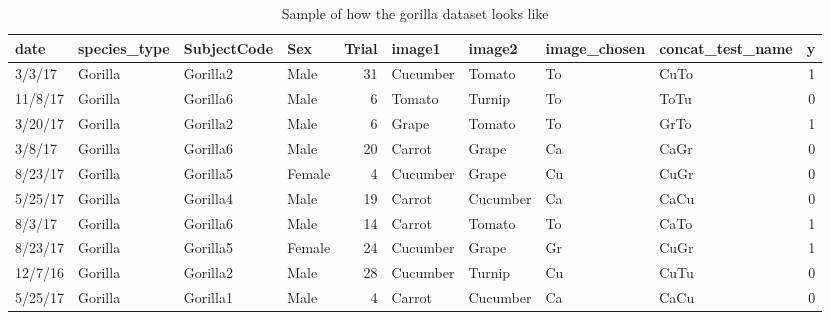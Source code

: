 \documentclass[
]{book}
\newenvironment{Shaded}{\begin{snugshade}}{\end{snugshade}}
\newcommand{\DataTypeTok}[1]{\textcolor[rgb]{0.13,0.29,0.53}{#1}}
\newcommand{\DecValTok}[1]{\textcolor[rgb]{0.00,0.00,0.81}{#1}}
\newcommand{\KeywordTok}[1]{\textcolor[rgb]{0.13,0.29,0.53}{\textbf{#1}}}
\newcommand{\NormalTok}[1]{#1}
\newcommand{\OperatorTok}[1]{\textcolor[rgb]{0.81,0.36,0.00}{\textbf{#1}}}
\newcommand{\StringTok}[1]{\textcolor[rgb]{0.31,0.60,0.02}{#1}}
\begin{document}
\begin{table}

\caption{\label{tab:unnamed-chunk-42}Sample of how the gorilla dataset looks like}
\centering
\begin{tabular}[t]{l|l|l|l|r|l|l|l|l|r}
\hline
date & species\_type & SubjectCode & Sex & Trial & image1 & image2 & image\_chosen & concat\_test\_name & y\\
\hline
3/3/17 & Gorilla & Gorilla2 & Male & 31 & Cucumber & Tomato & To & CuTo & 1\\
\hline
11/8/17 & Gorilla & Gorilla6 & Male & 6 & Tomato & Turnip & To & ToTu & 0\\
\hline
3/20/17 & Gorilla & Gorilla2 & Male & 6 & Grape & Tomato & To & GrTo & 1\\
\hline
3/8/17 & Gorilla & Gorilla6 & Male & 20 & Carrot & Grape & Ca & CaGr & 0\\
\hline
8/23/17 & Gorilla & Gorilla5 & Female & 4 & Cucumber & Grape & Cu & CuGr & 0\\
\hline
5/25/17 & Gorilla & Gorilla4 & Male & 19 & Carrot & Cucumber & Ca & CaCu & 0\\
\hline
8/3/17 & Gorilla & Gorilla6 & Male & 14 & Carrot & Tomato & To & CaTo & 1\\
\hline
8/23/17 & Gorilla & Gorilla5 & Female & 24 & Cucumber & Grape & Gr & CuGr & 1\\
\hline
12/7/16 & Gorilla & Gorilla2 & Male & 28 & Cucumber & Turnip & Cu & CuTu & 0\\
\hline
5/25/17 & Gorilla & Gorilla1 & Male & 4 & Carrot & Cucumber & Ca & CaCu & 0\\
\hline
\end{tabular}
\end{table}

\begin{Shaded}
\end{Shaded}
\end{document}
